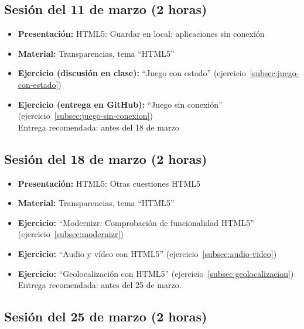 \documentclass[a4paper,12pt]{report}
\begin{document}
\subsection{Sesión del 11 de marzo (2 horas)}

\begin{itemize}
 \item \textbf{Presentación:} HTML5: Guardar en local; aplicaciones sin conexión
 \item \textbf{Material:} Transparencias, tema ``HTML5''
 \item \textbf{Ejercicio (discusión en clase):} ``Juego con estado'' (ejercicio~\ref{subsec:juego-con-estado})
 \item \textbf{Ejercicio (entrega en GitHub):} ``Juego sin conexión'' (ejercicio~\ref{subsec:juego-sin-conexion}) \\
 Entrega recomendada: antes del 18 de marzo
\end{itemize}

\subsection{Sesión del 18 de marzo (2 horas)}

\begin{itemize}
 \item \textbf{Presentación:} HTML5: Otras cuestiones HTML5
 \item \textbf{Material:} Transparencias, tema ``HTML5''
 \item \textbf{Ejercicio:} ``Modernizr: Comprobación de funcionalidad HTML5'' (ejercicio~\ref{subsec:modernizr})
 \item \textbf{Ejercicio:} ``Audio y vídeo con HTML5'' (ejercicio~\ref{subsec:audio-video})
 \item \textbf{Ejercicio:} ``Geolocalización con HTML5'' (ejercicio~\ref{subsec:geolocalizacion})
\\
Entrega recomendada: antes del 25 de marzo.
\end{itemize}


\subsection{Sesión del 25 de marzo (2 horas)}
\end{document}
